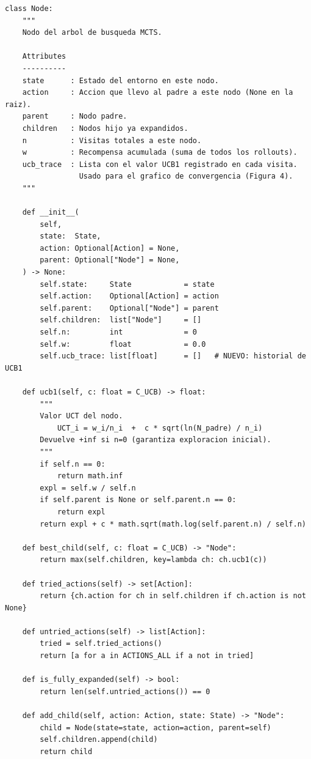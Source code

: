 \documentclass[12pt, a4paper]{article}
\begin{document}
\begin{lstlisting}[caption={Clase \texttt{Node} con registro de convergencia UCB}]
class Node:
    """
    Nodo del arbol de busqueda MCTS.

    Attributes
    ----------
    state      : Estado del entorno en este nodo.
    action     : Accion que llevo al padre a este nodo (None en la raiz).
    parent     : Nodo padre.
    children   : Nodos hijo ya expandidos.
    n          : Visitas totales a este nodo.
    w          : Recompensa acumulada (suma de todos los rollouts).
    ucb_trace  : Lista con el valor UCB1 registrado en cada visita.
                 Usado para el grafico de convergencia (Figura 4).
    """

    def __init__(
        self,
        state:  State,
        action: Optional[Action] = None,
        parent: Optional["Node"] = None,
    ) -> None:
        self.state:     State            = state
        self.action:    Optional[Action] = action
        self.parent:    Optional["Node"] = parent
        self.children:  list["Node"]     = []
        self.n:         int              = 0
        self.w:         float            = 0.0
        self.ucb_trace: list[float]      = []   # NUEVO: historial de UCB1

    def ucb1(self, c: float = C_UCB) -> float:
        """
        Valor UCT del nodo.
            UCT_i = w_i/n_i  +  c * sqrt(ln(N_padre) / n_i)
        Devuelve +inf si n=0 (garantiza exploracion inicial).
        """
        if self.n == 0:
            return math.inf
        expl = self.w / self.n
        if self.parent is None or self.parent.n == 0:
            return expl
        return expl + c * math.sqrt(math.log(self.parent.n) / self.n)

    def best_child(self, c: float = C_UCB) -> "Node":
        return max(self.children, key=lambda ch: ch.ucb1(c))

    def tried_actions(self) -> set[Action]:
        return {ch.action for ch in self.children if ch.action is not None}

    def untried_actions(self) -> list[Action]:
        tried = self.tried_actions()
        return [a for a in ACTIONS_ALL if a not in tried]

    def is_fully_expanded(self) -> bool:
        return len(self.untried_actions()) == 0

    def add_child(self, action: Action, state: State) -> "Node":
        child = Node(state=state, action=action, parent=self)
        self.children.append(child)
        return child
\end{lstlisting}
\end{document}
